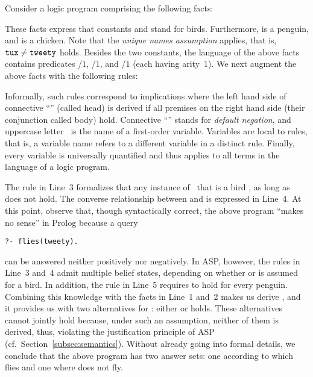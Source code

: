 \begin{example}\label{ex:flies}
Consider a logic program comprising the following facts:
%

%
These facts express that constants  and 
stand for birds.
Furthermore,  is a penguin, 
and  is a chicken.
%
Note that the \emph{unique names assumption} applies, that is,
$\texttt{tux}\neq\texttt{tweety}$ holds.
Besides the two constants,
the language of the above facts contains predicates
/$1$, /$1$, and /$1$
(each having arity~$1$).
%
We next augment the above facts with the following rules:%
%

%
Informally, such rules correspond to implications where the
left hand side of connective ``\code{:-}'' (called head)
is derived if all premises on the right hand side
(their conjunction called body) hold.
Connective ``'' stands for \emph{default negation},
and uppercase letter~ is the name of a first-order variable.
Variables are local to rules, that is,
a variable name refers to a different variable in a distinct rule.
Finally, every variable is universally quantified and thus
applies to all terms in the language of a logic program.

The rule in Line~3 formalizes that any instance of~ that is
a bird , as long as  does not hold.
The converse relationship between  and 
is expressed in Line~4.
At this point, observe that, though syntactically correct,
the above program ``makes no sense'' in Prolog because a query%
\begin{lstlisting}[numbers=none]
?- flies(tweety).
\end{lstlisting}
can be answered neither positively nor negatively.
In ASP, however, the rules in Line~3 and~4 admit multiple belief states,
depending on whether  or  is assumed for a bird.
In addition, the rule in Line~5 requires  to hold for every penguin.
Combining this knowledge with the facts in Line~1 and~2
makes us derive ,
and it provides us with two alternatives for :
either  or  holds.
These alternatives cannot jointly hold because, under such an assumption,
neither of them is derived, thus,
violating the justification principle of ASP (cf.\ Section~\ref{subsec:semantics}).
Without already going into formal details,
we conclude that the above program has two answer sets:
one according to which  flies and one where  does not fly.
\eexample
\end{example}


